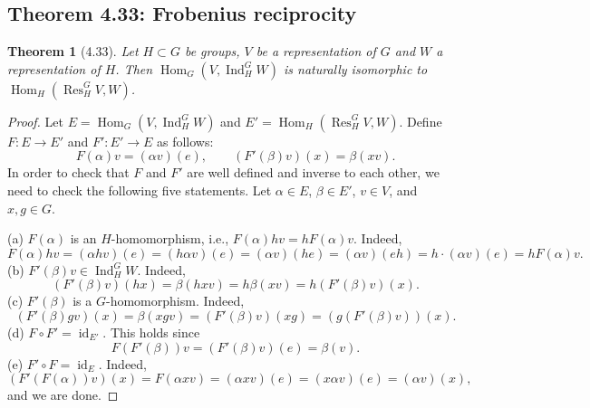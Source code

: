 \documentclass[UTF8,11pt,a4paper]{ctexart}
\newtheorem*{theorem}{Theorem}
\theoremstyle{definition}\newtheorem*{definition}{Definition}
\theoremstyle{remark}\newtheorem*{remark}{Remark}
\DeclareMathOperator{\Hom}{Hom}
\DeclareMathOperator{\Ind}{Ind}
\DeclareMathOperator{\Res}{Res}
\DeclareMathOperator{\id}{id}
\begin{document}
\subsection*{Theorem 4.33: Frobenius reciprocity}
\begin{theorem}[4.33]
Let $H\subset G$ be groups, $V$ be a representation of $G$ and $W$ a representation of $H$. Then $\Hom_G(V,\Ind_H^G W)$ is naturally isomorphic to $\Hom_H(\Res_H^G V,W)$.
\end{theorem}
\begin{proof}
Let $E=\Hom_G(V,\Ind_H^G W)$ and $E'=\Hom_H(\Res_H^G V,W)$.
Define $F:E\to E'$ and $F':E'\to E$ as follows:
\[
F(\alpha)v=(\alpha v)(e),\qquad (F'(\beta)v)(x)=\beta(xv).
\]
In order to check that $F$ and $F'$ are well defined and inverse to each other, we need to check the following five statements. Let $\alpha\in E$, $\beta\in E'$, $v\in V$, and $x,g\in G$.

(a) $F(\alpha)$ is an $H$-homomorphism, i.e., $F(\alpha)hv=hF(\alpha)v$. Indeed,
\[
F(\alpha)hv=(\alpha hv)(e)=(h\alpha v)(e)=(\alpha v)(he)=(\alpha v)(eh)=h\cdot(\alpha v)(e)=hF(\alpha)v.
\]
(b) $F'(\beta)v\in\Ind_H^G W$. Indeed,
\[
(F'(\beta)v)(hx)=\beta(hxv)=h\beta(xv)=h(F'(\beta)v)(x).
\]
(c) $F'(\beta)$ is a $G$-homomorphism. Indeed,
\[
(F'(\beta)gv)(x)=\beta(xgv)=(F'(\beta)v)(xg)=(g(F'(\beta)v))(x).
\]
(d) $F\circ F'=\id_{E'}$. This holds since
\[
F(F'(\beta))v=(F'(\beta)v)(e)=\beta(v).
\]
(e) $F'\circ F=\id_E$. Indeed,
\[
(F'(F(\alpha))v)(x)=F(\alpha xv)=(\alpha xv)(e)=(x\alpha v)(e)=(\alpha v)(x),
\]
and we are done.
\end{proof}
\end{document}
